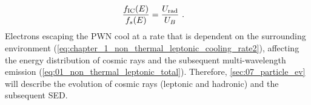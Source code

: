 \begin{equation}
    \begin{aligned}
    \frac{f_\text{IC}\qty(E)}{f_s\qty(E)}&=\frac{U_\text{rad}}{U_B}\text{ .}
    \end{aligned} \label{eq:chapter_IC_2_sync_ratio}
\end{equation}
\newpar
Electrons escaping the PWN cool at a rate that is dependent on the surrounding environment (\autoref{eq:chapter_1_non_thermal_leptonic_cooling_rate2}), affecting the energy distribution of cosmic rays and the subsequent multi-wavelength emission (\autoref{eq:01_non_thermal_leptonic_total}). Therefore, \autoref{sec:07_particle_ev} will describe the evolution of cosmic rays (leptonic and hadronic) and the subsequent SED.
